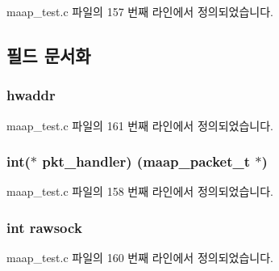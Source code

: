 maap\+\_\+test.\+c 파일의 157 번째 라인에서 정의되었습니다.



\subsection{필드 문서화}
\subsubsection[{\texorpdfstring{hwaddr}{hwaddr}}]{ hwaddr}\hypertarget{structmaap__test__state_ab94c768473f07d03807c003ca2898745}{}\label{structmaap__test__state_ab94c768473f07d03807c003ca2898745}


maap\+\_\+test.\+c 파일의 161 번째 라인에서 정의되었습니다.

\subsubsection[{\texorpdfstring{pkt\+\_\+handler}{pkt_handler}}]{\setlength{\rightskip}{0pt plus 5cm}int($\ast$ pkt\+\_\+handler) ({\bf maap\+\_\+packet\+\_\+t} $\ast$)}\hypertarget{structmaap__test__state_a55dec58daecbc653704ad3f1030cd10a}{}\label{structmaap__test__state_a55dec58daecbc653704ad3f1030cd10a}


maap\+\_\+test.\+c 파일의 158 번째 라인에서 정의되었습니다.

\subsubsection[{\texorpdfstring{rawsock}{rawsock}}]{\setlength{\rightskip}{0pt plus 5cm}int rawsock}\hypertarget{structmaap__test__state_a9a1008a3b40e75b22aa5d7945cbf2918}{}\label{structmaap__test__state_a9a1008a3b40e75b22aa5d7945cbf2918}


maap\+\_\+test.\+c 파일의 160 번째 라인에서 정의되었습니다.

